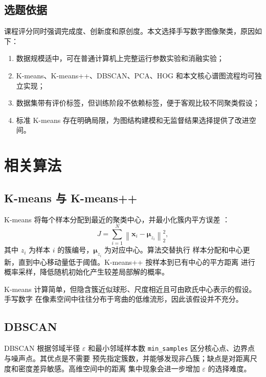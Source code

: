 \documentclass[12pt,a4paper,UTF8]{ctexart}
\begin{document}
\subsection{选题依据}

课程评分同时强调完成度、创新度和原创度。本文选择手写数字图像聚类，原因如下：

\begin{enumerate}
    \item 数据规模适中，可在普通计算机上完整运行参数实验和消融实验；
    \item K-means、K-means++、DBSCAN、PCA、HOG 和本文核心谱图流程均可独立实现；
    \item 数据集带有评价标签，但训练阶段不依赖标签，便于客观比较不同聚类假设；
    \item 标准 K-means 存在明确局限，为图结构建模和无监督结果选择提供了改进空间。
\end{enumerate}

\section{相关算法}

\subsection{K-means 与 K-means++}

K-means 将每个样本分配到最近的聚类中心，并最小化簇内平方误差
\cite{macqueen1967}：
\begin{equation}
    J=\sum_{i=1}^{N}\left\|
    \boldsymbol{x}_i-\boldsymbol{\mu}_{z_i}
    \right\|_2^2,
\end{equation}
其中 $z_i$ 为样本 $i$ 的簇编号，$\boldsymbol{\mu}_{z_i}$ 为对应中心。算法交替执行
样本分配和中心更新，直到中心移动量低于阈值。K-means++ 按样本到已有中心的平方距离
进行概率采样，降低随机初始化产生较差局部解的概率\cite{arthur2007}。

K-means 计算简单，但隐含簇近似球形、尺度相近且可由欧氏中心表示的假设。手写数字
在像素空间中往往分布于弯曲的低维流形，因此该假设并不充分。

\subsection{DBSCAN}

DBSCAN 根据邻域半径 $\varepsilon$ 和最小邻域样本数
\texttt{min\_samples} 区分核心点、边界点与噪声点\cite{ester1996}。其优点是不需要
预先指定簇数，并能够发现非凸簇；缺点是对距离尺度和密度差异敏感。高维空间中的距离
集中现象会进一步增加 $\varepsilon$ 的选择难度。
\end{document}

